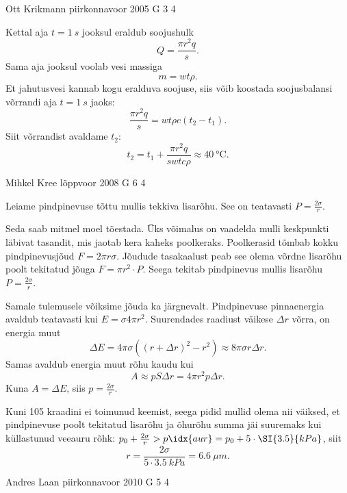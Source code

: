 \documentclass[11pt]{article}
\begin{document}
{%
{Ott Krikmann} %
{piirkonnavoor} %
{2005} %
{G 3} %
{4} %
{

\ifSolution
Kettal aja $t = \SI{1}{s}$ jooksul eraldub soojushulk
\[
Q = \frac{\pi r^2 q}{s}.
\]
Sama aja jooksul voolab vesi massiga
\[
m = wt\rho.
\]
Et jahutusvesi kannab kogu eralduva soojuse, siis võib koostada soojusbalansi võrrandi aja $t = \SI{1}{s}$ jaoks:
\[
\frac{\pi r^{2} q}{s}=w t \rho c\left(t_{2}-t_{1}\right).
\]
Siit võrrandist avaldame $t_2$:
\[
t_2 = t_1 + \frac{\pi r^2q}{swtc\rho} \approx \SI{40}{\celsius}.
\]
\fi
}

{Mihkel Kree} %
{lõppvoor} %
{2008} %
{G 6} %
{4} %
{

\ifSolution
Leiame pindpinevuse tõttu mullis tekkiva lisarõhu. See on teatavasti $P = \frac{2\sigma}{r}$.

Seda saab mitmel moel tõestada. Üks võimalus on vaadelda mulli keskpunkti läbivat tasandit, mis jaotab kera kaheks poolkeraks. Poolkerasid tõmbab kokku pindpinevusjõud $F = 2\pi r\sigma$. Jõudude tasakaalust peab see olema võrdne lisarõhu poolt tekitatud jõuga $F = \pi r^2 \cdot P$. Seega tekitab pindpinevus mullis lisarõhu $P = \frac{2\sigma}{r}$.

Samale tulemusele võiksime jõuda ka järgnevalt. Pindpinevuse pinnaenergia avaldub teatavasti kui $E = \sigma 4\pi r^2$. Suurendades raadiust väikese $\Delta r$ võrra, on energia muut 
\[
\Delta E = 4\pi \sigma ((r+\Delta r)^2-r^2) \approx 8\pi \sigma r\Delta r.
\]
Samas avaldub energia muut rõhu kaudu kui
\[
A \approx pS\Delta r = 4\pi r^2p\Delta r.
\]
Kuna $A = \Delta E$, siis $p = \frac{2\sigma}{r}$.

Kuni 105 kraadini ei toimunud keemist, seega pidid mullid olema nii väiksed, et pindpinevuse poolt tekitatud lisarõhu ja õhurõhu summa jäi suuremaks kui küllastunud veeauru rõhk: $p_0 + \frac{2\sigma}{r} > p\idx{aur} = p_0 + 5 \cdot \SI{3.5}{kPa}$, siit 
\[
r = \frac{2\sigma}{5\cdot\SI{3.5}{kPa}} = \SI{6.6}{\mu m}.
\]
\fi
}

{Andres Laan} %
{piirkonnavoor} %
{2010} %
{G 5} %
{4} %
{

}}
\end{document}
